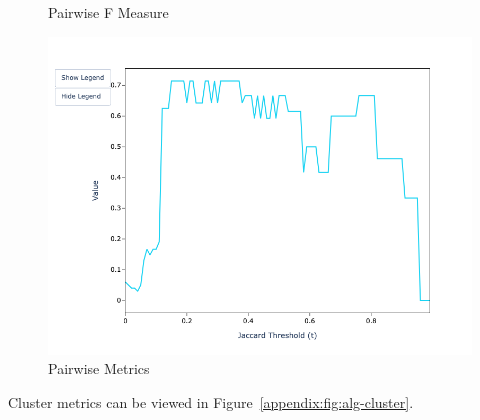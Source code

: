 \documentclass{article}
\begin{document}
\begin{figure}[htbp]
\begin{minipage}{0.32\textwidth}
            \caption*{Pairwise F Measure}
            \includegraphics[width=\textwidth]{sample-usage/mini-alg-pf}
        \end{minipage}
        \caption{Pairwise Metrics}\label{appendix:fig:alg-pairwise}
    \end{figure}

    Cluster metrics can be viewed in  Figure~\ref{appendix:fig:alg-cluster}.
\end{document}
